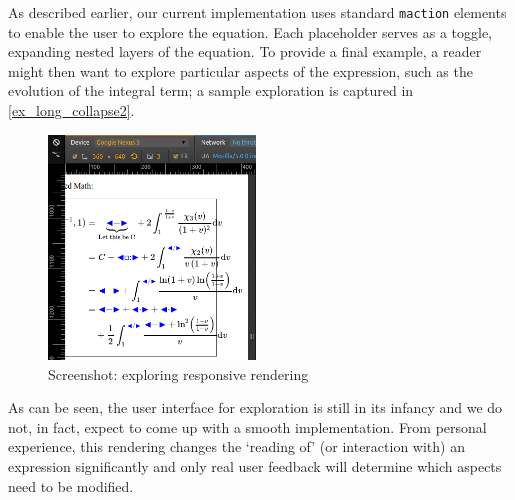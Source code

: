 \documentclass{llncs}
\begin{document}
As described earlier, our current implementation uses standard \texttt{maction} 
elements to enable the user to explore the equation. Each placeholder serves as 
a toggle, expanding nested layers of the equation. To provide a final example, 
a reader might then want to explore particular aspects of the expression, 
such as the evolution of the integral term; a sample exploration is captured in
\autoref{ex_long_collapse2}.


\begin{figure}
  \vspace{-35pt}
 \centering 
 \includegraphics[width=0.49\textwidth]{./ex_long_collapse2.png}
 \caption{Screenshot: exploring responsive rendering
\label{ex_long_collapse2}}
  \vspace{-20pt}
\end{figure}

As can be seen, the user interface for exploration is still in its infancy and 
we do not, in fact, expect to come up with a smooth implementation. From 
personal experience, this rendering changes the `reading of' (or interaction 
with) an expression significantly and only real user feedback will determine 
which aspects need to be modified.
\end{document}
